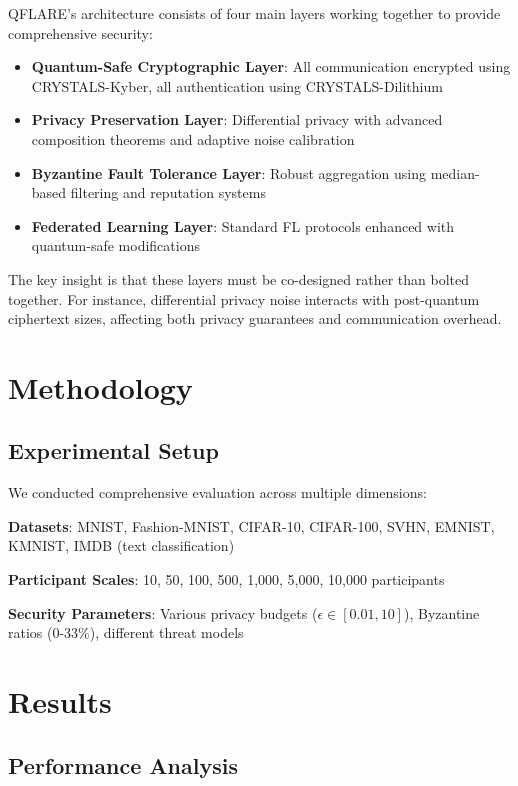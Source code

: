 \documentclass[journal,onecolumn]{IEEEtran}
\begin{document}
QFLARE's architecture consists of four main layers working together to provide comprehensive security:

\begin{itemize}
\item \textbf{Quantum-Safe Cryptographic Layer}: All communication encrypted using CRYSTALS-Kyber, all authentication using CRYSTALS-Dilithium
\item \textbf{Privacy Preservation Layer}: Differential privacy with advanced composition theorems and adaptive noise calibration
\item \textbf{Byzantine Fault Tolerance Layer}: Robust aggregation using median-based filtering and reputation systems
\item \textbf{Federated Learning Layer}: Standard FL protocols enhanced with quantum-safe modifications
\end{itemize}

The key insight is that these layers must be co-designed rather than bolted together. For instance, differential privacy noise interacts with post-quantum ciphertext sizes, affecting both privacy guarantees and communication overhead.

\section{Methodology}

\subsection{Experimental Setup}

We conducted comprehensive evaluation across multiple dimensions:

\textbf{Datasets}: MNIST, Fashion-MNIST, CIFAR-10, CIFAR-100, SVHN, EMNIST, KMNIST, IMDB (text classification)

\textbf{Participant Scales}: 10, 50, 100, 500, 1,000, 5,000, 10,000 participants

\textbf{Security Parameters}: Various privacy budgets ($\epsilon \in [0.01, 10]$), Byzantine ratios (0-33\%), different threat models

\section{Results}

\subsection{Performance Analysis}
\end{document}
